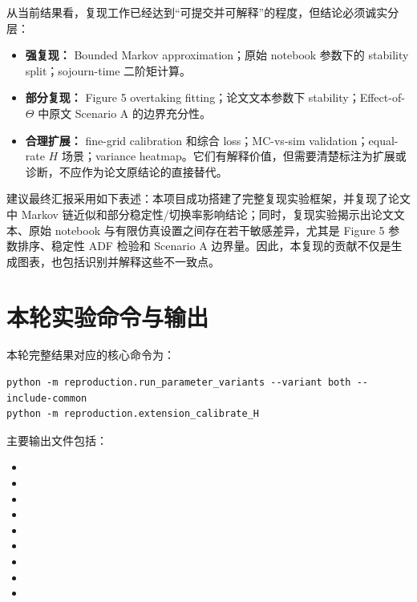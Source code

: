 \documentclass[UTF8,a4paper,11pt]{ctexart}
\begin{document}
从当前结果看，复现工作已经达到“可提交并可解释”的程度，但结论必须诚实分层：

\begin{itemize}
  \item \textbf{强复现：} Bounded Markov approximation；原始 notebook 参数下的 stability split；sojourn-time 二阶矩计算。
  \item \textbf{部分复现：} Figure 5 overtaking fitting；论文文本参数下 stability；Effect-of-$\Theta$ 中原文 Scenario A 的边界充分性。
  \item \textbf{合理扩展：} fine-grid calibration 和综合 loss；MC-vs-sim validation；equal-rate $H$ 场景；variance heatmap。它们有解释价值，但需要清楚标注为扩展或诊断，不应作为论文原结论的直接替代。
\end{itemize}

建议最终汇报采用如下表述：本项目成功搭建了完整复现实验框架，并复现了论文中 Markov 链近似和部分稳定性/切换率影响结论；同时，复现实验揭示出论文文本、原始 notebook 与有限仿真设置之间存在若干敏感差异，尤其是 Figure 5 参数排序、稳定性 ADF 检验和 Scenario A 边界量。因此，本复现的贡献不仅是生成图表，也包括识别并解释这些不一致点。

\appendix
\section{本轮实验命令与输出}

本轮完整结果对应的核心命令为：

\begin{verbatim}
python -m reproduction.run_parameter_variants --variant both --include-common
python -m reproduction.extension_calibrate_H
\end{verbatim}

主要输出文件包括：

\begin{itemize}
  \item {}
  \item {}
  \item {}
  \item {}
  \item {}
  \item {}
  \item {}
  \item {}
  \item {}
\end{itemize}
\end{document}
